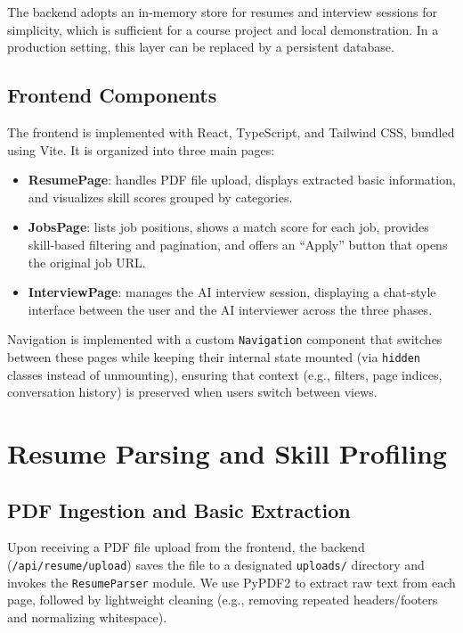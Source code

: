 \documentclass[11pt,a4paper]{article}
\begin{document}
The backend adopts an in-memory store for resumes and interview sessions for simplicity, which is sufficient for a course project and local demonstration. In a production setting, this layer can be replaced by a persistent database.

\subsection{Frontend Components}

The frontend is implemented with React, TypeScript, and Tailwind CSS, bundled using Vite. It is organized into three main pages:

\begin{itemize}
    \item \textbf{ResumePage}: handles PDF file upload, displays extracted basic information, and visualizes skill scores grouped by categories.
    \item \textbf{JobsPage}: lists job positions, shows a match score for each job, provides skill-based filtering and pagination, and offers an ``Apply'' button that opens the original job URL.
    \item \textbf{InterviewPage}: manages the AI interview session, displaying a chat-style interface between the user and the AI interviewer across the three phases.
\end{itemize}

Navigation is implemented with a custom \texttt{Navigation} component that switches between these pages while keeping their internal state mounted (via \texttt{hidden} classes instead of unmounting), ensuring that context (e.g., filters, page indices, conversation history) is preserved when users switch between views.

\section{Resume Parsing and Skill Profiling}

\subsection{PDF Ingestion and Basic Extraction}

Upon receiving a PDF file upload from the frontend, the backend (\texttt{/api/resume/upload}) saves the file to a designated \texttt{uploads/} directory and invokes the \texttt{ResumeParser} module. We use PyPDF2 to extract raw text from each page, followed by lightweight cleaning (e.g., removing repeated headers/footers and normalizing whitespace).
\end{document}
